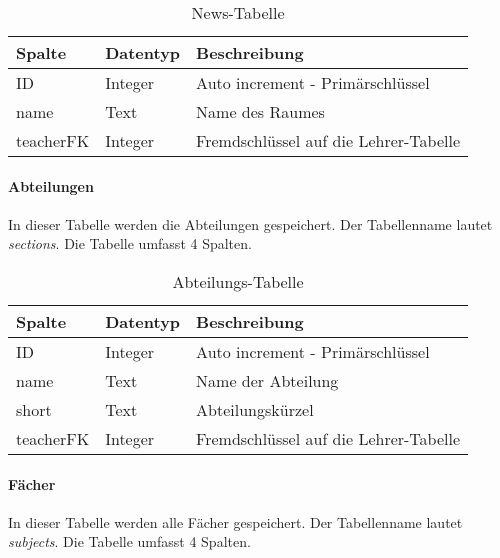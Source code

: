 \begin{table}[H]
\centering
\begin{tabular}{p{2.5 cm}p{2.5 cm}p{10 cm}}
   \toprule
   \textbf{Spalte} & \textbf{Datentyp} & \textbf{Beschreibung} \\
   \midrule
          ID & Integer & Auto increment - Primärschlüssel  \\
          \hline
          name & Text & Name des Raumes  \\
          \hline        
          teacherFK & Integer & Fremdschlüssel auf die Lehrer-Tabelle \\
   \bottomrule
\end{tabular}
\caption{News-Tabelle}
\end{table}

\paragraph{Abteilungen\\}
In dieser Tabelle werden die Abteilungen gespeichert. Der Tabellenname lautet \textit{sections}. Die Tabelle umfasst 4 Spalten.

\begin{table}[H]
\centering
\begin{tabular}{p{2.5 cm}p{2.5 cm}p{10 cm}}
   \toprule
   \textbf{Spalte} & \textbf{Datentyp} & \textbf{Beschreibung} \\
   \midrule
          ID & Integer & Auto increment - Primärschlüssel  \\
          \hline
          name & Text & Name der Abteilung   \\
          \hline
	      short & Text & Abteilungskürzel   \\
	      \hline
          teacherFK & Integer & Fremdschlüssel auf die Lehrer-Tabelle   \\
   \bottomrule
\end{tabular}
\caption{Abteilungs-Tabelle}
\end{table}

\paragraph{Fächer\\}
In dieser Tabelle werden alle Fächer gespeichert. Der Tabellenname lautet \textit{subjects}. Die Tabelle umfasst 4 Spalten.

